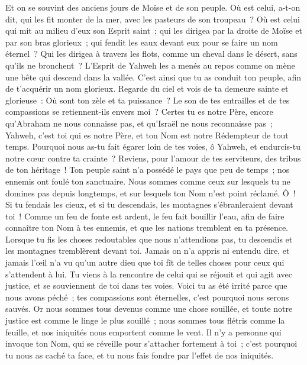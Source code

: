 \begin{multicols}{2}
Et on se souvint des anciens jours de Moïse et de son peuple. Où est celui, a-t-on dit, qui les fit monter de la mer, avec les pasteurs de son troupeau~? Où est celui qui mit au milieu d'eux son Esprit saint~;
qui les dirigea par la droite de Moïse et par son bras glorieux~; qui fendit les eaux devant eux pour se faire un nom éternel~?
Qui les dirigea à travers les flots, comme un cheval dans le désert, sans qu'ils ne bronchent~?
L'Esprit de Yahweh les a menés au repos comme on mène une bête qui descend dans la vallée. C'est ainsi que tu as conduit ton peuple, afin de t'acquérir un nom glorieux.
Regarde du ciel et vois de ta demeure sainte et glorieuse~: Où sont ton zèle et ta puissance~? Le son de tes entrailles et de tes compassions se retiennent-ils envers moi~?
Certes tu es notre Père, encore qu'Abraham ne nous connaisse pas, et qu'Israël ne nous reconnaisse pas~; Yahweh, c'est toi qui es notre Père, et ton Nom est notre Rédempteur de tout temps.
Pourquoi nous as-tu fait égarer loin de tes voies, ô Yahweh, et endurcis-tu notre cœur contre ta crainte~? Reviens, pour l'amour de tes serviteurs, des tribus de ton héritage~!
Ton peuple saint n'a possédé le pays que peu de temps~; nos ennemis ont foulé ton sanctuaire.
Nous sommes comme ceux sur lesquels tu ne domines pas depuis longtemps, et sur lesquels ton Nom n'est point réclamé. Ô~! Si tu fendais les cieux, et si tu descendais, les montagnes s'ébranleraient devant toi~!
\VerseOne{}Comme un feu de fonte est ardent, le feu fait bouillir l'eau, afin de faire connaître ton Nom à tes ennemis, et que les nations tremblent en ta présence.
Lorsque tu fis les choses redoutables que nous n'attendions pas, tu descendis et les montagnes tremblèrent devant toi.
Jamais on n'a appris ni entendu dire, et jamais l'œil n'a vu qu'un autre dieu que toi fît de telles choses pour ceux qui s'attendent à lui.
Tu viens à la rencontre de celui qui se réjouit et qui agit avec justice, et se souviennent de toi dans tes voies. Voici tu as été irrité parce que nous avons péché~; tes compassions sont éternelles, c'est pourquoi nous serons sauvés.
Or nous sommes tous devenus comme une chose souillée, et toute notre justice est comme le linge le plus souillé~; nous sommes tous flétris comme la feuille, et nos iniquités nous emportent comme le vent.
Il n'y a personne qui invoque ton Nom, qui se réveille pour s'attacher fortement à toi~; c'est pourquoi tu nous as caché ta face, et tu nous fais fondre par l'effet de nos iniquités.

\end{multicols}
